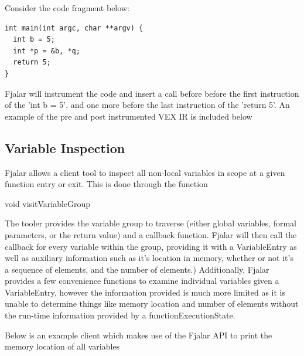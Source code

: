 \documentclass[11pt]{article}
\begin{document}
Consider the code fragment below:

\lstset{language=C, frame=single,}
\begin{lstlisting}
int main(int argc, char **argv) {
  int b = 5;
  int *p = &b, *q;
  return 5;
}
\end{lstlisting}

Fjalar will instrument the code and insert a call before before the
first instruction of the 'int b = 5', and one more before the last
instruction of the 'return 5'. An example of the pre and post
instrumented  VEX IR is included below



\subsection{Variable Inspection}

Fjalar allows a client tool to inspect all non-local  variables in
scope at a given function entry or exit. This is done through the
function 

void visitVariableGroup

The tooler provides the variable group to traverse (either global
variables, formal parameters, or the return value) and a callback
function. Fjalar will then call the callback for every variable within
the group, providing it with a VariableEntry as well as auxiliary
information such as it's location in memory, whether or not it's a
sequence of elements, and the number of elements.) Additionally,
Fjalar provides a few convenience functions to examine individual
variables given a VariableEntry, however the information provided is
much more limited as it is unable to determine things like memory
location and number of elements without the run-time information
provided by a functionExecutionState.

Below is an example client  which makes use of the Fjalar API to print
the memory location of all variables




\end{document}
